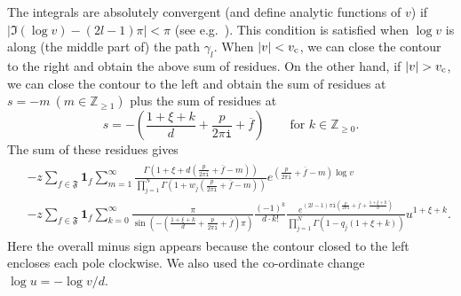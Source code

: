 \documentclass[11pt]{amsart}
\theoremstyle{definition} %
\theoremstyle{remark} %
\newcommand{\ZZ}{\mathbb Z}
\providecommand{\abs}[1]{\lvert#1\rvert}
\def\nn{N}
\def\ol{\overline}
\newcommand{\frF}{\mathfrak{F}}
\newcommand{\unit}{\boldsymbol{1}}
\newcommand{\ov}{\overline}
\newcommand{\iu}{\mathtt{i}}
\newcommand{\vc}{v_{\rm c}}
\begin{document}
The integrals are absolutely convergent 
(and define analytic functions of $v$)  
if $\abs{\Im (\log v) - (2l-1)\pi}<\pi$ 
(see e.g.\ \cite[Lemma 3.3]{Ho}). 
This condition is satisfied when $\log v$ 
is along (the middle part of) the path $\gamma_l$. 
When $|v|<\vc$, we can close the contour 
to the right and obtain the above sum of residues.
On the other hand, if $|v|>\vc$, 
we can close the contour to the left and  
obtain the sum of residues at
$s=-m\ (m\in \ZZ_{\ge 1})$
plus the sum of residues at
\begin{equation*}
s=-\left(\frac{1+\xi +k}d+\frac{p}{2\pi\iu} +\ol f\right) 
\qquad \text{for $k\in \ZZ_{\ge 0}$}.
\end{equation*}
The sum of these residues gives  
\begin{align}
\label{eq:residuesum-left}  
\begin{split} 
& - z \sum_{f\in \frF} \unit_f 
\sum_{m =1}^\infty  
\frac{\Gamma(1+\xi + d(\frac{p}{2\pi\iu} +\ov{f} - m ))}
{\prod_{j=1}^\nn \Gamma(1+w_j(\frac{p}{2\pi\iu} +\ov{f} -m))} 
e^{(\frac{p}{2\pi\iu} + \ov{f}-m) \log v}  \\ 
& - z \sum_{f\in \frF} \unit_f 
\sum_{k=0}^\infty \frac{\pi}
{\sin \left(-\left( \frac{1+\xi +k}{d} + 
\frac{p}{2\pi\iu} +\ov{f} \right) \pi \right)} 
\frac{(-1)^k}{d \cdot k!}
\frac{e^{(2l-1)\pi\iu 
(\frac{p}{2\pi\iu} + \ov{f} + \frac{1+\xi+k}{d})}}
{\prod_{j=1}^N \Gamma(1 -q_j(1+\xi+k))}
u^{1+\xi+k}. 
\end{split} 
\end{align} 
Here the overall minus sign appears because 
the contour closed to the left encloses each pole clockwise. 
We also used the co-ordinate change $\log u = -\log v/d$. 
\end{document}
